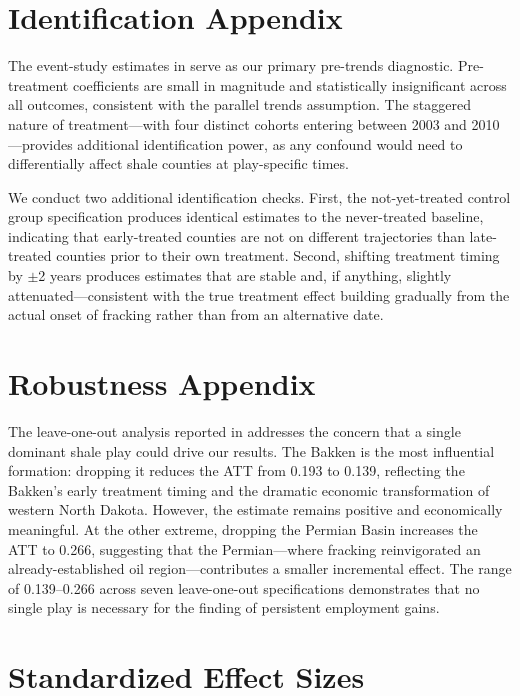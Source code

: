 \documentclass[12pt]{article}
\begin{document}
\section{Identification Appendix}
\label{sec:appendix_id}

The event-study estimates in  serve as our primary pre-trends diagnostic. Pre-treatment coefficients are small in magnitude and statistically insignificant across all outcomes, consistent with the parallel trends assumption. The staggered nature of treatment---with four distinct cohorts entering between 2003 and 2010---provides additional identification power, as any confound would need to differentially affect shale counties at play-specific times.

We conduct two additional identification checks. First, the not-yet-treated control group specification produces identical estimates to the never-treated baseline, indicating that early-treated counties are not on different trajectories than late-treated counties prior to their own treatment. Second, shifting treatment timing by $\pm$2 years produces estimates that are stable and, if anything, slightly attenuated---consistent with the true treatment effect building gradually from the actual onset of fracking rather than from an alternative date.

\section{Robustness Appendix}
\label{sec:appendix_robust}

The leave-one-out analysis reported in  addresses the concern that a single dominant shale play could drive our results. The Bakken is the most influential formation: dropping it reduces the ATT from 0.193 to 0.139, reflecting the Bakken's early treatment timing and the dramatic economic transformation of western North Dakota. However, the estimate remains positive and economically meaningful. At the other extreme, dropping the Permian Basin increases the ATT to 0.266, suggesting that the Permian---where fracking reinvigorated an already-established oil region---contributes a smaller incremental effect. The range of 0.139--0.266 across seven leave-one-out specifications demonstrates that no single play is necessary for the finding of persistent employment gains.

\section{Standardized Effect Sizes}
\label{sec:sde}


\end{document}
